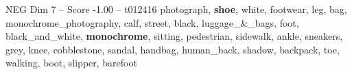 \begin{textsample}{NEG Dim 7 – Score -1.00 – t012416}  \label{ex:f7_neg_030}
photograph, \textbf{shoe}, white, footwear, leg, bag, monochrome\_photography, calf, street, black, luggage\_\&\_bags, foot, black\_and\_white, \textbf{monochrome}, sitting, pedestrian, sidewalk, ankle, sneakers, grey, knee, cobblestone, sandal, handbag, human\_back, shadow, backpack, toe, walking, boot, slipper, barefoot

\end{textsample}
